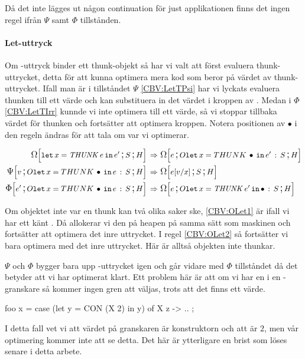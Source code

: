 \documentclass[../Optimise]{subfiles}
\begin{document}
Då det inte lägges ut någon continuation för just applikationen finns det ingen regel
ifrån $\Psi$ samt $\Phi$ tillstånden.



\paragraph{Let-uttryck}

Om -uttryck binder ett thunk-objekt så har vi valt att först evaluera thunk-uttrycket, 
detta för att kunna optimera mera kod som beror på värdet av thunk-uttrycket. Ifall
man är i tillståndet $\Psi$ \eqref{CBV:LetTPsi} har vi lyckats evaluera thunken till ett värde och kan
substituera in det värdet i kroppen av . Medan i $\Phi$ \eqref{CBV:LetTIrr} kunnde vi inte
optimera till ett värde, så vi stoppar tillbaka värdet för thunken och fortsätter att
optimera kroppen. Notera positionen av $\bullet$ i den regeln ändras för att tala om
var vi optimerar.

\begin{align}
\label{CBV:LetTOmg} \OMEGA SH{\eLet x{\THUNK e}{e'}}  \rulesep &\, \OMEGA{\oLet x{e'}S}He\\
\label{CBV:LetTPsi} \PSI{\oLet xeS}Hv  \rulesep &\, \OMEGA SH{e[v/x]} \\
\label{CBV:LetTIrr} \IRR{\oLet xeS}H{e'}  \rulesep &\, \OMEGA{\oLetObj x{\THUNK{e'}}S}He
\end{align}

Om objektet inte var en thunk kan två olika saker ske, \eqref{CBV:OLet1} är ifall 
vi har ett känt . Då allokerar vi den på heapen på samma sätt som maskinen
och fortsätter att optimera det inre uttrycket. I regel \eqref{CBV:OLet2} så 
fortsätter vi bara optimera med det inre uttrycket. Här är alltså objekten
inte thunkar.

$\Psi$ och $\Phi$ bygger bara upp -uttrycket igen och går vidare med $\Phi$ tillståndet
då det betyder att vi har optimerat klart. Ett problem här är att om vi har en 
i en -granskare så kommer ingen gren att väljas, trots att det finns ett värde.

\begin{codeEx}
foo x = case (let y = CON (X 2) in y) of
    { X z -> ..
    };
\end{codeEx} 

I detta fall vet vi att värdet på granskaren är konstruktorn  och att  är $2$, men vår optimering
kommer inte att se detta. Det här är ytterligare en brist som löses senare i detta arbete.
\end{document}
